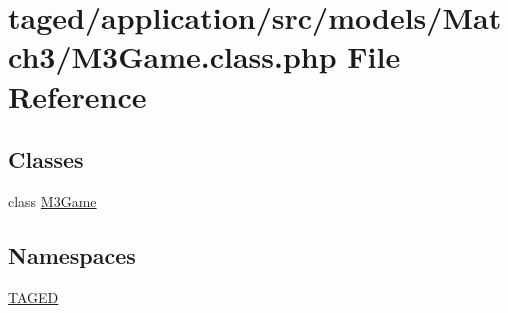 \hypertarget{_m3_game_8class_8php}{}\section{taged/application/src/models/\+Match3/\+M3\+Game.class.\+php File Reference}
\label{_m3_game_8class_8php}
\subsection*{Classes}
\begin{DoxyCompactItemize}
\item 
class \hyperlink{class_m3_game}{M3\+Game}
\end{DoxyCompactItemize}
\subsection*{Namespaces}
\begin{DoxyCompactItemize}
\item 
 \hyperlink{namespace_t_a_g_e_d}{T\+A\+G\+ED}
\end{DoxyCompactItemize}
